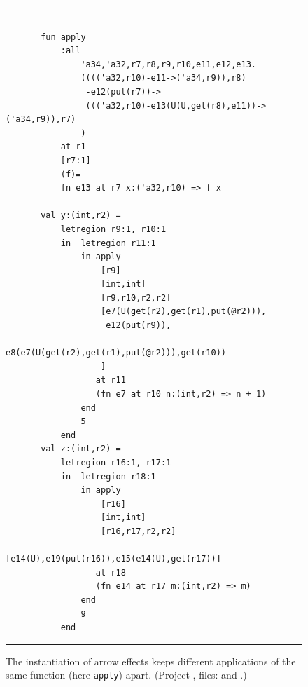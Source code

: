 \documentclass[12pt]{book}
\begin{document}
\begin{figure}
\hrule
\begin{verbatim} 

       fun apply 
           :all 
               'a34,'a32,r7,r8,r9,r10,e11,e12,e13.
               (((('a32,r10)-e11->('a34,r9)),r8)
                -e12(put(r7))->
                ((('a32,r10)-e13(U(U,get(r8),e11))->('a34,r9)),r7)
               ) 
           at r1 
           [r7:1] 
           (f)= 
           fn e13 at r7 x:('a32,r10) => f x

       val y:(int,r2) = 
           letregion r9:1, r10:1 
           in  letregion r11:1 
               in apply
                   [r9] 
                   [int,int] 
                   [r9,r10,r2,r2] 
                   [e7(U(get(r2),get(r1),put(@r2))),
                    e12(put(r9)),
                    e8(e7(U(get(r2),get(r1),put(@r2))),get(r10))
                   ]
                  at r11 
                  (fn e7 at r10 n:(int,r2) => n + 1) 
               end
               5 
           end
       val z:(int,r2) = 
           letregion r16:1, r17:1 
           in  letregion r18:1 
               in apply
                   [r16] 
                   [int,int] 
                   [r16,r17,r2,r2] 
                   [e14(U),e19(put(r16)),e15(e14(U),get(r17))]
                  at r18 
                  (fn e14 at r17 m:(int,r2) => m) 
               end
               9 
           end
\end{verbatim}
\caption{The instantiation of arrow effects keeps different applications of
  the same function (here {\tt apply}) apart. (Project
  , files:  and
  .)}
\medskip
\hrule
\label{lam2.fig}
\end{figure}
\end{document}
